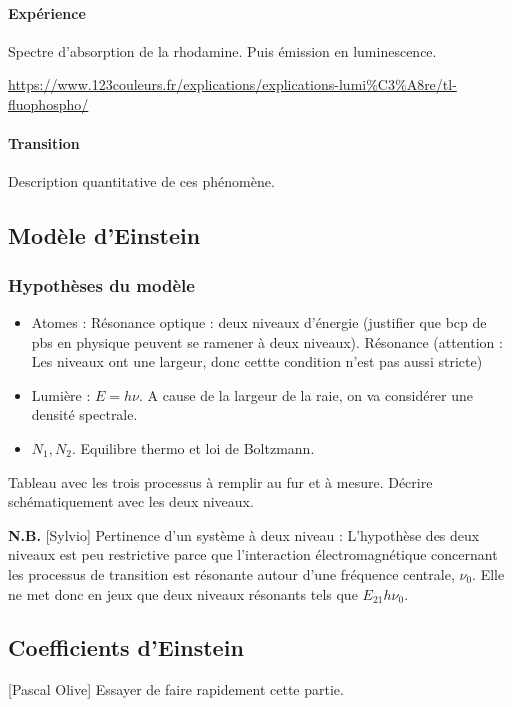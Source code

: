 \documentclass[11pt]{report}
\numberwithin{figure}{section}
\numberwithin{equation}{section}
\numberwithin{table}{section}
\newcommand{\1}{\boldsymbol{1}}
\begin{document}
\paragraph*{Expérience} Spectre d'absorption de la rhodamine. Puis émission en luminescence.

\url{https://www.123couleurs.fr/explications/explications-lumi%C3%A8re/tl-fluophospho/}

\paragraph{Transition} Description quantitative de ces phénomène.

\subsection{Modèle d'Einstein}


\subsubsection{Hypothèses du modèle}

\begin{itemize}
\item Atomes : Résonance optique : deux niveaux d'énergie (justifier que bcp de pbs en physique peuvent se ramener à deux niveaux). Résonance (attention : Les niveaux ont une largeur, donc cettte condition n’est pas aussi stricte)
\item Lumière : $E = h \nu$. A cause de la largeur de la raie, on va considérer une densité spectrale.
\item $N_1, N_2$. Equilibre thermo et loi de Boltzmann.
\end{itemize}

Tableau avec les trois processus à remplir au fur et à mesure. Décrire schématiquement avec les deux niveaux. 

\textbf{N.B.} [Sylvio] Pertinence d’un système à deux niveau : L’hypothèse des deux niveaux est peu restrictive parce que l’interaction électromagnétique concernant les processus de transition est résonante autour d’une fréquence centrale, $\nu_0$.
Elle ne met donc en jeux que deux niveaux résonants tels que $E_{21} h \nu_0$.


\subsection{Coefficients d'Einstein}

[Pascal Olive] Essayer de faire rapidement cette partie.
\end{document}
